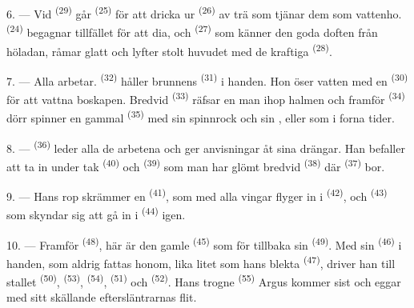 6. --- Vid  \textsuperscript{(29)} går  \textsuperscript{(25)}
för att dricka ur  \textsuperscript{(26)} av trä som tjänar dem som vattenho.
 \textsuperscript{(24)} begagnar tillfället för att dia, och 
\textsuperscript{(27)} som känner den goda doften från höladan, råmar glatt och lyfter stolt
huvudet med de kraftiga  \textsuperscript{(28)}.

7. --- Alla arbetar.  \textsuperscript{(32)} håller brunnens
 \textsuperscript{(31)} i handen. Hon öser vatten med en
 \textsuperscript{(30)} för att vattna boskapen. Bredvid
 \textsuperscript{(33)} räfsar en man ihop halmen och framför
 \textsuperscript{(34)} dörr spinner en gammal
 \textsuperscript{(35)} med sin spinnrock och sin
,  eller  som i forna tider.

\VUsaut{3.0mm}
\VUsaut{3.0mm}

8. ---  \textsuperscript{(36)} leder alla de arbetena och ger anvisningar åt
sina drängar. Han befaller att ta in under tak  \textsuperscript{(40)} och
 \textsuperscript{(39)} som man har glömt bredvid 
\textsuperscript{(38)} där  \textsuperscript{(37)} bor.

9. --- Hans rop skrämmer en  \textsuperscript{(41)}, som med alla vingar flyger
in i  \textsuperscript{(42)}, och
 \textsuperscript{(43)} som skyndar sig att gå in i
 \textsuperscript{(44)} igen.

10. --- Framför  \textsuperscript{(48)}, här är den gamle
 \textsuperscript{(45)} som för tillbaka sin 
\textsuperscript{(49)}. Med sin  \textsuperscript{(46)} i handen, som aldrig
fattas honom, lika litet som hans blekta  \textsuperscript{(47)}, driver han till
stallet  \textsuperscript{(50)},  \textsuperscript{(53)},
 \textsuperscript{(54)},  \textsuperscript{(51)} och
 \textsuperscript{(52)}. Hans trogne 
\textsuperscript{(55)} Argus kommer sist och eggar med sitt skällande eftersläntrarnas flit.

